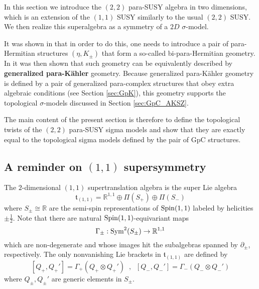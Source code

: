 \documentclass{article}
\newcommand{\RR}{\mathbb{R}}
\theoremstyle{definition}
\theoremstyle{remark}
\begin{document}
In this section we introduce the $(2,2)$ para-SUSY algebra in two dimensions, which is an extension of the $(1,1)$ SUSY similarly to the usual $(2,2)$ SUSY. We then realize this superalgebra as a symmetry of a $2D$ $\sigma$-model.

It was shown in \cite{HullTwistedSUSY} that in order to do this, one needs to introduce a pair of para-Hermitian structures $(\eta,K_\pm)$ that form a so-called bi-para-Hermitian geometry. In \cite{Hu:2019zro} it was then shown that such geometry can be equivalently described by {\bf generalized para-K\"ahler} geometry. Because generalized para-K\"ahler geometry is defined by a pair of generalized para-complex structures that obey extra algebraic conditions (see Section \ref{sec:GpK}), this geometry supports the topological $\sigma$-models discussed in Section \ref{sec:GpC_AKSZ}.

The main content of the present section is therefore to define the topological twists of the $(2,2)$ para-SUSY sigma models and show that they are exactly equal to the topological sigma models defined by the pair of GpC structures.
%
%

\subsection{A reminder on $(1,1)$ supersymmetry}

The $2$-dimensional $(1,1)$ supertranslation algebra is the super Lie algebra
\[
\mathfrak{t}_{(1,1)} = \RR^{1,1} \oplus \Pi (S_+) \oplus \Pi(S_-)
\]
where $S_\pm \cong \RR$ are the semi-spin representations of ${\rm Spin}(1,1)$ labeled by helicities $\pm \frac{1}{2}$. 
Note that there are natural ${\rm Spin}(1,1)$-equivariant maps
\[
\Gamma_{\pm} : {\rm Sym}^2(S_\pm) \to \RR^{1,1}
\]
which are non-degenerate and whose images hit the subalgebras spanned by $\partial_{\pm}$, respectively. 
The only nonvanishing Lie brackets in $\mathfrak{t}_{(1,1)}$ are defined by
\[
[Q_+, Q_+'] = \Gamma_+(Q_+ \otimes Q_+') \;\; , \;\; [Q_-, Q_-'] = \Gamma_-(Q_- \otimes Q_-')
\]  
where $Q_\pm, Q_\pm'$ are generic elements in $S_\pm$. 
\end{document}
